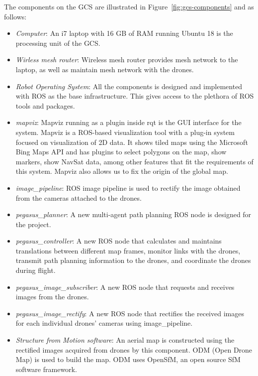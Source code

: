 The components on the GCS are illustrated in Figure~\ref{fig:gcs-components} and as follows:
\begin{itemize}
	\item \textit{Computer}: An i7 laptop with 16 GB of RAM running Ubuntu 18 is the processing unit of the GCS.
	\item \textit{Wirless mesh router}:  Wireless mesh router provides mesh network to the laptop, as well as maintain mesh network with the drones.
	\item \textit{Robot Operating System}: All the components is designed and implemented with ROS as the base infrastructure. This gives access to the plethora of ROS tools and packages.
	\item \textit{mapviz}: Mapviz running as a plugin inside rqt is the GUI interface for the system. Mapviz is a ROS-based visualization tool with a plug-in system focused on visualization of 2D data. It shows tiled maps using the Microsoft Bing Maps API and has plugins to select polygons on the map, show markers, show NavSat data, among other features that fit the requirements of this system. Mapviz also allows us to fix the origin of the global map.
	\item \textit{image\_pipeline}: ROS image pipeline is used to rectify the image obtained from the cameras attached to the drones.
	\item \textit{pegasus\_planner}: A new multi-agent path planning ROS node is designed for the project.
	\item \textit{pegasus\_controller}: A new ROS node that calculates and maintains translations between different map frames, monitor links with the drones, transmit path planning information to the drones, and coordinate the drones during flight.
	\item \textit{pegasus\_image\_subscriber}: A new ROS node that requests and receives images from the drones.
	\item \textit{pegasus\_image\_rectify}: A new ROS node that rectifies the received images for each individual drones' cameras using image\_pipeline.  
	\item \textit{Structure from Motion software}: An aerial map is constructed using the rectified images acquired from drones by this component. ODM (Open Drone Map) is used to build the map. ODM uses OpenSfM, an open source SfM software framework.
\end{itemize}

